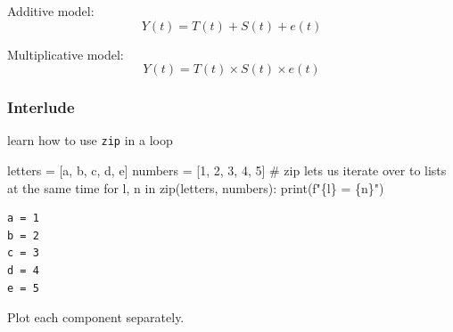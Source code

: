 \documentclass[
  letterpaper,
  DIV=11,
  numbers=noendperiod,
  oneside]{scrreprt}
\newenvironment{Shaded}{\begin{snugshade}}{\end{snugshade}}
\newcommand{\BuiltInTok}[1]{\textcolor[rgb]{0.00,0.23,0.31}{#1}}
\newcommand{\CommentTok}[1]{\textcolor[rgb]{0.37,0.37,0.37}{#1}}
\newcommand{\ControlFlowTok}[1]{\textcolor[rgb]{0.00,0.23,0.31}{#1}}
\newcommand{\DecValTok}[1]{\textcolor[rgb]{0.68,0.00,0.00}{#1}}
\newcommand{\KeywordTok}[1]{\textcolor[rgb]{0.00,0.23,0.31}{#1}}
\newcommand{\NormalTok}[1]{\textcolor[rgb]{0.00,0.23,0.31}{#1}}
\newcommand{\OperatorTok}[1]{\textcolor[rgb]{0.37,0.37,0.37}{#1}}
\newcommand{\SpecialCharTok}[1]{\textcolor[rgb]{0.37,0.37,0.37}{#1}}
\newcommand{\SpecialStringTok}[1]{\textcolor[rgb]{0.13,0.47,0.30}{#1}}
\newcommand{\StringTok}[1]{\textcolor[rgb]{0.13,0.47,0.30}{#1}}
\begin{document}
Additive model: \[
Y(t) = T(t) + S(t) + e(t)
\]

Multiplicative model: \[
Y(t) = T(t) \times S(t) \times e(t)
\]

\hypertarget{interlude}{%
\subsubsection{Interlude}\label{interlude}}

learn how to use \texttt{zip} in a loop

\begin{Shaded}
\begin{Highlighting}[]
\NormalTok{letters }\OperatorTok{=}\NormalTok{ [}\StringTok{\textquotesingle{}a\textquotesingle{}}\NormalTok{, }\StringTok{\textquotesingle{}b\textquotesingle{}}\NormalTok{, }\StringTok{\textquotesingle{}c\textquotesingle{}}\NormalTok{, }\StringTok{\textquotesingle{}d\textquotesingle{}}\NormalTok{, }\StringTok{\textquotesingle{}e\textquotesingle{}}\NormalTok{]}
\NormalTok{numbers }\OperatorTok{=}\NormalTok{ [}\DecValTok{1}\NormalTok{, }\DecValTok{2}\NormalTok{, }\DecValTok{3}\NormalTok{, }\DecValTok{4}\NormalTok{, }\DecValTok{5}\NormalTok{]}
\CommentTok{\# zip let\textquotesingle{}s us iterate over to lists at the same time}
\ControlFlowTok{for}\NormalTok{ l, n }\KeywordTok{in} \BuiltInTok{zip}\NormalTok{(letters, numbers):}
    \BuiltInTok{print}\NormalTok{(}\SpecialStringTok{f"}\SpecialCharTok{\{}\NormalTok{l}\SpecialCharTok{\}}\SpecialStringTok{ = }\SpecialCharTok{\{}\NormalTok{n}\SpecialCharTok{\}}\SpecialStringTok{"}\NormalTok{)}
\end{Highlighting}
\end{Shaded}

\begin{verbatim}
a = 1
b = 2
c = 3
d = 4
e = 5
\end{verbatim}

Plot each component separately.
\end{document}
